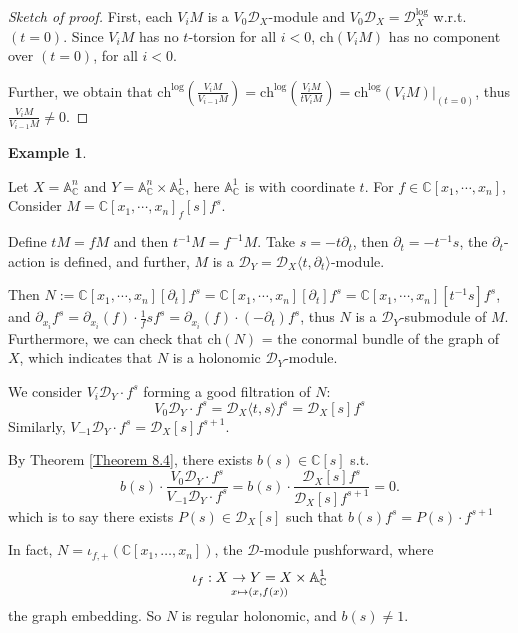 \documentclass[openany]{book}
\theoremstyle{definition} %
\newtheorem{example}[theorem]{Example}       %
\theoremstyle{remark}
\begin{document}
\begin{proof}[Sketch of proof]
    First, each $V_i M$ is a $V_0 \mathcal{D}_X$-module and $V_0 \mathcal{D}_X = \mathcal{D}_X^{\log}$ w.r.t. $(t = 0)$. Since $V_i M$ has no $t$-torsion for all $i < 0$, $\mathrm{ch}(V_i M)$ has no component over $(t = 0)$, for all $i < 0$.

    Further, we obtain that $\mathrm{ch}^{\log}\left(\frac{V_i M}{V_{i-1} M}\right) = \mathrm{ch}^{\log}\left(\frac{V_i M}{t V_i M}\right)= \mathrm{ch}^{\log}(V_i M)\big|_{(t=0)}$, thus $\frac{V_i M}{V_{i-1} M} \neq 0.$

\end{proof}


\begin{example}\label{Example 8.11}

    Let $X = \mathbb{A}_{\mathbb{C}}^n$ and $Y = \mathbb{A}_{\mathbb{C}}^n \times \mathbb{A}_{\mathbb{C}}^1$, here $\mathbb{A}^{1}_{\mathbb{C}}$ is with coordinate $t$.
    For $f \in \mathbb{C}[x_1, \cdots, x_n]$, Consider $M = \mathbb{C}[x_1, \cdots, x_n]_f[s] f^s$.

    Define $t M = f M$ and then $t^{-1} M = f^{-1} M$.  Take $s = -t\partial_t$, then $\partial_t = -t^{-1} s$, the $\partial_{t}$-action is defined, and further, $M$ is a $\mathcal{D}_Y = \mathcal{D}_X \langle t, \partial_t \rangle$-module.

    Then $N := \mathbb{C}[x_1, \cdots, x_n][\partial_t] f^s = \mathbb{C}[x_1, \cdots, x_n][\partial_t] f^s= \mathbb{C}[x_1, \cdots, x_n][t^{-1} s] f^s$, and $\partial_{x_i} f^s = \partial_{x_i}(f) \cdot \frac{1}{f} s f^s= \partial_{x_i}(f) \cdot (-\partial_t) f^s$, thus $N$ is a $\mathcal{D}_Y$-submodule of $M$. Furthermore, we can check that $\mathrm{ch}(N)$ = the conormal bundle of the graph of $X$, which indicates that $N$ is a holonomic $\mathcal{D}_{Y}$-module.

    We consider $V_{i}\mathcal{D}_{Y}\cdot f^{s}$ forming a good filtration of $N$: $$V_0 \mathcal{D}_Y \cdot f^s = \mathcal{D}_X \langle t, s \rangle f^s = \mathcal{D}_X[s] f^s$$Similarly, $V_{-1} \mathcal{D}_Y \cdot f^s = \mathcal{D}_X[s] f^{s+1}$.

    By Theorem \ref{Theorem 8.4}, there exists $b(s) \in \mathbb{C}[s]$ s.t.$$
        b(s) \cdot \frac{V_0 \mathcal{D}_Y \cdot f^s}{V_{-1} \mathcal{D}_Y \cdot f^s} = b(s) \cdot \frac{\mathcal{D}_X[s] f^s}{\mathcal{D}_X[s] f^{s+1}} = 0.$$which is to say there exists $P(s)\in \mathcal{D}_{X}[s]$ such that $b(s) f^s = P(s) \cdot f^{s+1}$

    In fact, $N = \iota_{f,+} (\mathbb{C}[x_1, \ldots, x_n])$, the $\mathcal{D}$-module pushforward, where $$\iota_f: X \to Y = X \times \mathbb{A}^{1}_{\mathbb{C}}\atop x \mapsto (x, f(x))$$the graph embedding. So $N$ is regular holonomic, and $b(s) \neq 1$.
\end{example}
\end{document}
